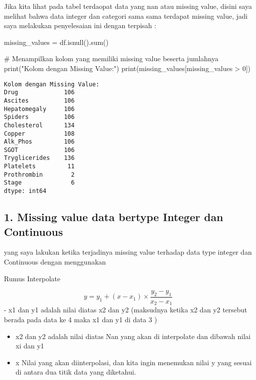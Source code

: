 \documentclass[
  letterpaper,
]{krantz}
\makeatletter
\newenvironment{Shaded}{\begin{snugshade}}{\end{snugshade}}
\newcommand{\BuiltInTok}[1]{\textcolor[rgb]{0.00,0.23,0.31}{#1}}
\newcommand{\CommentTok}[1]{\textcolor[rgb]{0.37,0.37,0.37}{#1}}
\newcommand{\DecValTok}[1]{\textcolor[rgb]{0.68,0.00,0.00}{#1}}
\newcommand{\NormalTok}[1]{\textcolor[rgb]{0.00,0.23,0.31}{#1}}
\newcommand{\OperatorTok}[1]{\textcolor[rgb]{0.37,0.37,0.37}{#1}}
\newcommand{\StringTok}[1]{\textcolor[rgb]{0.13,0.47,0.30}{#1}}
\newenvironment{kframe}{%
\medskip{}
\setlength{\fboxsep}{.8em}
 \def\at@end@of@kframe{}%
 \ifinner\ifhmode%
  \def\at@end@of@kframe{\end{minipage}}%
  \begin{minipage}{\columnwidth}%
 \fi\fi%
 \def\FrameCommand##1{\hskip\@totalleftmargin \hskip-\fboxsep
 \colorbox{shadecolor}{##1}\hskip-\fboxsep
     \hskip-\linewidth \hskip-\@totalleftmargin \hskip\columnwidth}%
 \MakeFramed {\advance\hsize-\width
   \@totalleftmargin\z@ \linewidth\hsize
   \@setminipage}}%
 {\par\unskip\endMakeFramed%
 \at@end@of@kframe}
\renewenvironment{Shaded}{\begin{kframe}}{\end{kframe}}
\makeatother
\begin{document}
Jika kita lihat pada tabel terdaopat data yang nan atau missing value,
disini saya melihat bahwa data integer dan categori sama sama terdapat
missing value, jadi saya melakukan penyelesaian ini dengan terpisah :

\begin{Shaded}
\begin{Highlighting}[]
\NormalTok{missing\_values }\OperatorTok{=}\NormalTok{ df.isnull().}\BuiltInTok{sum}\NormalTok{()}

\CommentTok{\# Menampilkan kolom yang memiliki missing value beserta jumlahnya}
\BuiltInTok{print}\NormalTok{(}\StringTok{"Kolom dengan Missing Value:"}\NormalTok{)}
\BuiltInTok{print}\NormalTok{(missing\_values[missing\_values }\OperatorTok{\textgreater{}} \DecValTok{0}\NormalTok{])}
\end{Highlighting}
\end{Shaded}

\begin{verbatim}
Kolom dengan Missing Value:
Drug             106
Ascites          106
Hepatomegaly     106
Spiders          106
Cholesterol      134
Copper           108
Alk_Phos         106
SGOT             106
Tryglicerides    136
Platelets         11
Prothrombin        2
Stage              6
dtype: int64
\end{verbatim}

\hypertarget{missing-value-data-bertype-integer-dan-continuous-1}{%
\subsection{1. Missing value data bertype Integer dan
Continuous}\label{missing-value-data-bertype-integer-dan-continuous-1}}

yang saya lakukan ketika terjadinya missing value terhadap data type
integer dan Continuous dengan menggunakan

Rumus Interpolate

\[
y = y_1 + (x - x_1) \times \frac{{y_2 - y_1}}{{x_2 - x_1}}
\] - x1 dan y1 adalah nilai diatas x2 dan y2 (maksudnya ketika x2 dan y2
tersebut berada pada data ke 4 maka x1 dan y1 di data 3 )

\begin{itemize}
\item
  x2 dan y2 adalah nilai diatas Nan yang akan di interpolate dan dibawah
  nilai xi dan y1
\item
  x Nilai yang akan diinterpolasi, dan kita ingin menemukan nilai y yang
  sesuai di antara dua titik data yang diketahui.
\end{itemize}
\end{document}
